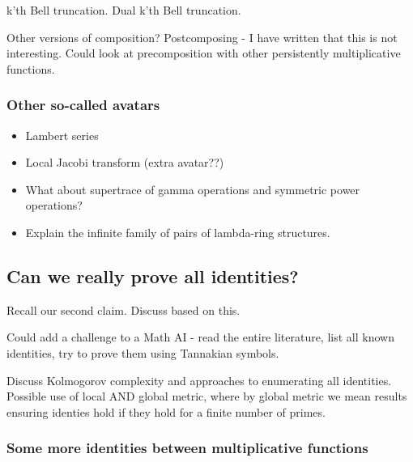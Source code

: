 \documentclass[a4paper]{article}
\begin{document}
\begin{propdef}
k'th Bell truncation. Dual k'th Bell truncation.
\end{propdef}


Other versions of composition? Postcomposing - I have written that this is not interesting. Could look at precomposition with other persistently multiplicative functions.

\subsubsection{Other so-called avatars}

\begin{itemize}

\item Lambert series
\item Local Jacobi transform (extra avatar??)
\item What about supertrace of gamma operations and symmetric power operations?
\item Explain the infinite family of pairs of lambda-ring structures.
\end{itemize}




\subsection{Can we really prove all identities?}

Recall our second claim. Discuss based on this.

Could add a challenge to a Math AI - read the entire literature, list all known identities, try to prove them using Tannakian symbols.

Discuss Kolmogorov complexity and approaches to enumerating all identities. Possible use of local AND global metric, where by global metric we mean results ensuring identies hold if they hold for a finite number of primes.

\subsubsection{Some more identities between multiplicative functions}
\end{document}

